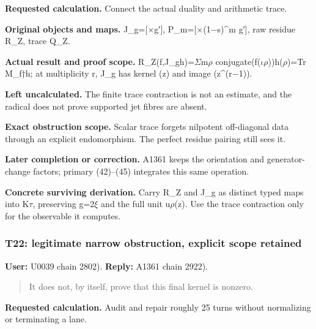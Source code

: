 \textbf{Requested calculation.} Connect the actual duality and
arithmetic trace.

\textbf{Original objects and maps.}
J\_g=[\allowbreak{}\ensuremath{×}\allowbreak{}g′],
P\_m=[\allowbreak{}\ensuremath{×}\allowbreak{}(1\allowbreak{}\ensuremath{−}\allowbreak{}s)\textasciicircum{}m
g′{]}, raw residue R\_Z, trace Q\_Z.

\textbf{Actual result and proof scope.}
R\_Z(f,J\_gh)=\allowbreak{}\ensuremath{Σ}\allowbreak{}m\allowbreak{}\ensuremath{ρ}\allowbreak{}
conjugate(f(\allowbreak{}\ensuremath{ι}\allowbreak{}\allowbreak{}\ensuremath{ρ}\allowbreak{}))h(\allowbreak{}\ensuremath{ρ}\allowbreak{})=Tr
M\_f†h; at multiplicity r, J\_g has kernel (z) and image
(z\textasciicircum{}(r\allowbreak{}\ensuremath{−}\allowbreak{}1)).

\textbf{Left uncalculated.} The finite trace contraction is not an
estimate, and the radical does not prove supported jet fibres are
absent.

\textbf{Exact obstruction scope.} Scalar trace forgets nilpotent
off-diagonal data through an explicit endomorphism. The perfect residue
pairing still sees it.

\textbf{Later completion or correction.} A1361 keeps the orientation and
generator-change factors; primary (42)--(45) integrates this same
operation.

\textbf{Concrete surviving derivation.} Carry R\_Z and J\_g as distinct
typed maps into K\allowbreak{}\ensuremath{τ}\allowbreak{}, preserving
g=2\allowbreak{}\ensuremath{ξ}\allowbreak{} and the full unit
u\allowbreak{}\ensuremath{ρ}\allowbreak{}(z). Use the trace contraction
only for the observable it computes.

\subsubsection{T22: legitimate narrow obstruction, explicit scope
retained}\label{TranscriptLedgerStage:t22-legitimate-narrow-obstruction-explicit-scope-retained}

\textbf{User:} U0039
\protect{} chain 2802).
\textbf{Reply:} A1361
\protect{} chain 2922).

\begin{quote}
It does not, by itself, prove that this final kernel is nonzero.
\end{quote}

\textbf{Requested calculation.} Audit and repair roughly 25 turns
without normalizing or terminating a lane.

